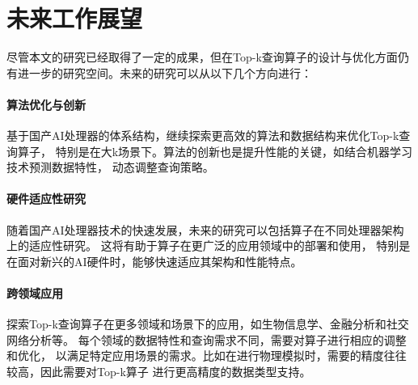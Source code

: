 \section{未来工作展望}
尽管本文的研究已经取得了一定的成果，但在Top-k查询算子的设计与优化方面仍有进一步的研究空间。未来的研究可以从以下几个方向进行：
\paragraph{算法优化与创新}
基于国产AI处理器的体系结构，继续探索更高效的算法和数据结构来优化Top-k查询算子，
特别是在大k场景下。算法的创新也是提升性能的关键，如结合机器学习技术预测数据特性，
动态调整查询策略。

\paragraph{硬件适应性研究}
随着国产AI处理器技术的快速发展，未来的研究可以包括算子在不同处理器架构上的适应性研究。
这将有助于算子在更广泛的应用领域中的部署和使用，
特别是在面对新兴的AI硬件时，能够快速适应其架构和性能特点。

\paragraph{跨领域应用}
探索Top-k查询算子在更多领域和场景下的应用，如生物信息学、金融分析和社交网络分析等。
每个领域的数据特性和查询需求不同，需要对算子进行相应的调整和优化，
以满足特定应用场景的需求。比如在进行物理模拟时，需要的精度往往较高，因此需要对Top-k算子
进行更高精度的数据类型支持。

